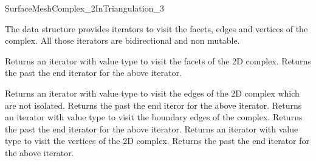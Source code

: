 \begin{ccRefConcept}{SurfaceMeshComplex_2InTriangulation_3}






The data structure provides iterators  to visit  
the facets, edges and vertices of the complex.
All those iterators are bidirectional and
non mutable.

{Returns an iterator with value type  to visit the facets
of the 2D complex.}
\ccGlue
{}
{Returns the  past the end iterator for the above iterator.}

{Returns an iterator with value type  to visit the
edges of the 2D complex which are not isolated.}
\ccGlue
{}
{Returns the past the end iteror for the above iterator.}
\ccGlue
{}
{Returns an iterator with value type  to visit the
boundary  edges of the complex.}
\ccGlue
{}
{Returns the past the end iterator for the above iterator.}
\ccGlue
{}
{Returns an iterator with value type  to visit the
vertices of the 2D complex.}
\ccGlue
{}
{Returns the past the end iterator for the above iterator.}



\end{ccRefConcept}
